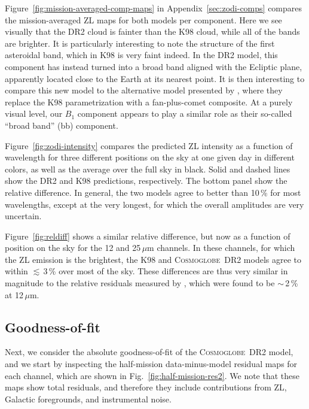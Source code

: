 \documentclass[twocolumn]{aa}
\newcommand{\cosmoglobe}{\textsc{Cosmoglobe}}
\begin{document}
Figure~\ref{fig:mission-averaged-comp-maps} in
Appendix~\ref{sec:zodi-comps} compares the mission-averaged ZL maps
for both models per component. Here we see visually that the DR2 cloud
is fainter than the K98 cloud, while all of the bands are brighter. It
is particularly interesting to note the structure of the first
asteroidal band, which in K98 is very faint indeed. In the DR2 model,
this component has instead turned into a broad band aligned with the
Ecliptic plane, apparently located close to the Earth at its nearest
point. It is then interesting to compare this new model to the
alternative model presented by \citet{Robinson2013}, where they
replace the K98 parametrization with a fan-plus-comet composite. At a
purely visual level, our $B_1$ component appears to play a similar
role as their so-called ``broad band'' (bb) component.

Figure~\ref{fig:zodi-intensity} compares the predicted ZL intensity
as a function of wavelength for three different positions on the sky
at one given day in different colors, as well as the average over the
full sky in black. Solid and dashed lines show the DR2 and K98
predictions, respectively. The bottom panel show the relative
difference. In general, the two models agree to better than 10\,\% for
most wavelengths, except at the very longest, for which the overall
amplitudes are very uncertain.

Figure~\ref{fig:reldiff} shows a similar relative difference, but now
as a function of position on the sky for the 12 and 25\,$\mu$m
channels. In these channels, for which the ZL emission is the
brightest, the K98 and \cosmoglobe\ DR2 models agree to within
$\lesssim$\,3\,\% over most of the sky. These differences are thus
very similar in magnitude to the relative residuals measured by
\citet{Kelsall1998}, which were found to be $\sim$\,2\,\% at
12\,$\mu$m.

\subsection{Goodness-of-fit}

Next, we consider the absolute goodness-of-fit of the \cosmoglobe\ DR2
model, and we start by inspecting the half-mission data-minus-model
residual maps for each channel, which are shown in
Fig.~\ref{fig:half-mission-res2}. We note that these maps show total
residuals, and therefore they include contributions from ZL, Galactic
foregrounds, and instrumental noise.
\end{document}
